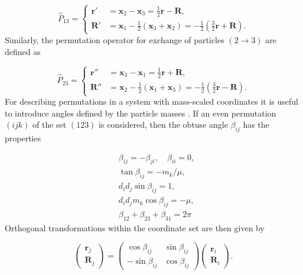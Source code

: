 \documentclass{article}
\begin{document}
\begin{equation}
\hat{P}_{13} = \left \{ \begin{aligned}
\mathbf{r}' &= \mathbf{x}_2 - \mathbf{x}_3 = \frac{1}{2}\mathbf{r} - \mathbf{R}, \\
\mathbf{R}' &= \mathbf{x}_1 - \frac{1}{2}(\mathbf{x}_3 + \mathbf{x}_2) = -\frac{1}{2}(\frac{3}{2} \mathbf{r} + \mathbf{R}). 
\end{aligned}
\right.
\end{equation}
Similarly, the permutation operator for exchange of particles $(2 \rightarrow 3)$ are defined as

\begin{equation}
\hat{P}_{23} = \left \{ \begin{aligned}
\mathbf{r}'' &= \mathbf{x}_3 - \mathbf{x}_1 = \frac{1}{2}\mathbf{r} + \mathbf{R}, \\
\mathbf{R}'' &= \mathbf{x}_2 - \frac{1}{2}(\mathbf{x}_1 + \mathbf{x}_3) = -\frac{1}{2} (\frac{3}{2} \mathbf{r} - \mathbf{R}).
\end{aligned}
\right.
\end{equation}
For describing permutations in a system with mass-scaled coordinates it is useful to introduce angles defined by the particle masses \cite{Smith1962}\cite{Johnson1980}. If an even permutation $(ijk)$ of the set $(123)$ is considered, then the obtuse angle $\beta_{ij}$ has the properties

\begin{subequations}
	\begin{align}
	&\beta_{ij} = -\beta_{ji}, \quad \beta_{ii} = 0,\\
	&\tan\beta_{ij} = -m_k/\mu,\\
	&d_{i}d_{j} \sin\beta_{ij} = 1,\\
	&d_{i}d_{j} m_{k} \cos\beta_{ij} = -\mu,\\
	&\beta_{12}+\beta_{23}+\beta_{31} = 2\pi
	\end{align}
\end{subequations}
Orthogonal transformations within the coordinate set are then given by 

\begin{equation}
\begin{pmatrix}
\mathbf{r}_j\\
\mathbf{R}_j
\end{pmatrix}
=
\begin{pmatrix}
\cos\beta_{ij} & \sin\beta_{ij}\\
-\sin\beta_{ij} & \cos\beta_{ij}
\end{pmatrix}
\begin{pmatrix}
\mathbf{r}_i\\
\mathbf{R}_i
\end{pmatrix}.
\end{equation}   
\end{document}
